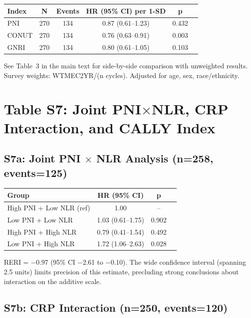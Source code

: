 \documentclass[11pt,a4paper]{article}
\begin{document}
\begin{center}
\small
\begin{tabular}{lccccc}
\toprule
Index & N & Events & HR (95\% CI) per 1-SD & p \\
\midrule
PNI   & 270 & 134 & 0.87 (0.61--1.23) & 0.432 \\
CONUT & 270 & 134 & 0.76 (0.63--0.91) & 0.003 \\
GNRI  & 270 & 134 & 0.80 (0.61--1.05) & 0.103 \\
\bottomrule
\end{tabular}
\end{center}

See Table~3 in the main text for side-by-side comparison with unweighted results.
Survey weights: WTMEC2YR/(n cycles). Adjusted for age, sex, race/ethnicity.

\section*{Table S7: Joint PNI$\times$NLR, CRP Interaction, and CALLY Index}
\label{tab:s7}

\subsection*{S7a: Joint PNI $\times$ NLR Analysis (n=258, events=125)}

\begin{center}
\begin{tabular}{lccc}
\toprule
Group & HR (95\% CI) & p \\
\midrule
High PNI + Low NLR (ref) & 1.00 & -- \\
Low PNI + Low NLR  & 1.03 (0.61--1.75) & 0.902 \\
High PNI + High NLR & 0.79 (0.41--1.54) & 0.492 \\
Low PNI + High NLR  & 1.72 (1.06--2.63) & 0.028 \\
\bottomrule
\end{tabular}
\end{center}

RERI = $-$0.97 (95\% CI $-$2.61 to $-$0.10). The wide confidence interval (spanning 2.5 units) limits precision of this estimate, precluding strong conclusions about interaction on the additive scale.

\subsection*{S7b: CRP Interaction (n=250, events=120)}
\end{document}

